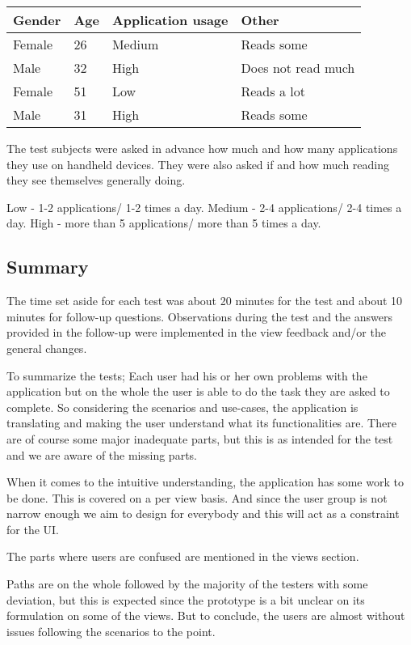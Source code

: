 \begin{table}[H]
	\begin{center}
		\begin{tabular}{ | l | l | l | l |}
			\hline
			\textbf{Gender} & \textbf{Age} & \textbf{Application usage} & \textbf{Other} \\ \hline
			Female & 26 & Medium & Reads some \\\hline
			Male & 32 & High & Does not read much \\\hline
			Female & 51 & Low & Reads a lot \\\hline
			Male & 31 & High & Reads some \\\hline 
			
		\end{tabular}
	\end{center}
\end{table}

The test subjects were asked in advance how much and how many applications they use on handheld devices. They were also asked if and how much reading they see themselves generally doing.\newline

Low - 1-2 applications/ 1-2 times a day.
Medium - 2-4 applications/ 2-4 times a day.
High - more than 5 applications/ more than 5 times a day.


\subsection{Summary}
The time set aside for each test was about 20 minutes for the test and about 10 minutes for follow-up questions. Observations during the test and the answers provided in the follow-up were implemented in the view feedback and/or the general changes.

To summarize the tests; Each user had his or her own problems with the application but on the whole the user is able to do the task they are asked to complete. So considering the scenarios and use-cases, the application is translating and making the user understand what its functionalities are. There are of course some major inadequate parts, but this is as intended for the test and we are aware of the missing parts.

When it comes to the intuitive understanding, the application has some work to be done. This is covered on a per view basis. And since the user group is not narrow enough we aim to design for everybody and this will act as a constraint for the UI. 

The parts where users are confused are mentioned in the views section.

Paths are on the whole followed by the majority of the testers with some deviation, but this is expected since the prototype is a bit unclear on its formulation on some of the views. But to conclude, the users are almost without issues following the scenarios to the point.

\cleardoublepage